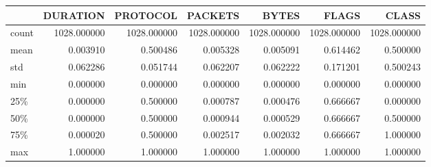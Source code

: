 \begin{tabular}{lrrrrrr}
\toprule
{} &     DURATION &     PROTOCOL &      PACKETS &        BYTES &        FLAGS &        CLASS \\
\midrule
count &  1028.000000 &  1028.000000 &  1028.000000 &  1028.000000 &  1028.000000 &  1028.000000 \\
mean  &     0.003910 &     0.500486 &     0.005328 &     0.005091 &     0.614462 &     0.500000 \\
std   &     0.062286 &     0.051744 &     0.062207 &     0.062222 &     0.171201 &     0.500243 \\
min   &     0.000000 &     0.000000 &     0.000000 &     0.000000 &     0.000000 &     0.000000 \\
25\%   &     0.000000 &     0.500000 &     0.000787 &     0.000476 &     0.666667 &     0.000000 \\
50\%   &     0.000000 &     0.500000 &     0.000944 &     0.000529 &     0.666667 &     0.500000 \\
75\%   &     0.000020 &     0.500000 &     0.002517 &     0.002032 &     0.666667 &     1.000000 \\
max   &     1.000000 &     1.000000 &     1.000000 &     1.000000 &     1.000000 &     1.000000 \\
\bottomrule
\end{tabular}
